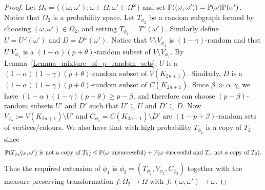 \begin{proof}
Let $\Omega_2=\{(\omega, \omega'): \omega\in \Omega, \omega'\in \Omega^{\omega}\}$ and set $\P((\omega, \omega'))=\P(\omega)\P(\omega')$. Notice that $\Omega_2$ is a probability space.
Let $T_{\phi_2}$ be a random subgraph formed by choosing $(\omega, \omega')\in \Omega_2$, and setting $T_{\phi_2}= T^\omega(\omega')$. Similarly define $U=U^{\omega}(\omega')$ and $D=D^{\omega}(\omega')$. Notice that $V\setminus V_{\phi_1}$ is $(1-\gamma)$-random and that $U|V_{\phi_1}$ is a $(1-\alpha)(p+\theta)$-random subset of $V\setminus V_{\phi_1}$. By Lemma~\ref{Lemma_mixture_of_p_random_sets}, $U$  is a $(1-\alpha)(1-\gamma)(p+\theta)$-random subset of $V(K_{2n+1})$. Similarly, $D$ is a $(1-\alpha)(1-\gamma)(p+\theta)$-random  subset of $C(K_{2n+1})$. Since $\beta\gg \alpha,\gamma$, we have $(1-\alpha)(1-\gamma)(p+\theta)\geq p-\beta$, and therefore can choose $(p-\beta)$-random subsets $U'$ and $D'$ such that $U'\subseteq  U$ and  $D'\subseteq D$.
Now $V_{\phi_2}:=V(K_{2n+1})\setminus U'$ and $C_{\phi_2}=C(K_{2n+1})\setminus D'$ are $(1-p+\beta)$-random sets of vertices/colours.
We also have that with high probability $T_{\phi_2}$ is a copy of $T_2$ since
$$\P(\text{$T_{\phi_2}(\omega, \omega')$ is not a copy of $T_2$})\leq \P(\text{$\omega$ unsuccessful})+\P(\text{$\omega$ successful and $T_{\omega}$ not a copy of $T_2$}).$$
Thus the required extension of $\phi_1$ is  $\phi_{2}=(T_{\phi_2}, V_{\phi_2}, C_{\phi_2})$ together with the measure preserving transformation $f:\Omega_2\to \Omega$ with $f:(\omega, \omega')\to\omega$.
\end{proof}




